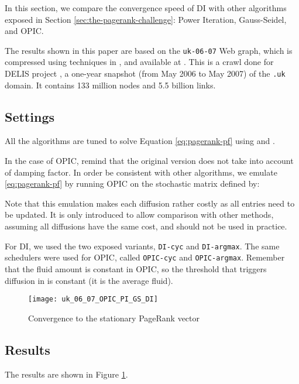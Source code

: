 \documentclass{llncs}
\begin{document}
\label{sec:experiments}
In this section, we compare the convergence speed of DI with other algorithms exposed in Section \ref{sec:the-pagerank-challenge}: Power Iteration, Gauss-Seidel, and OPIC.

The results shown in this paper are based on the 
\texttt{uk-06-07} Web graph, which is compressed using techniques in \cite{BRSLLP},\cite{BV03} and available at \cite{webgraph}. This is a crawl done for DELIS project \cite{DELISProj}, a one-year snapshot (from May 2006 to May 2007) of the \texttt{.uk} domain. It contains 133 million nodes and  5.5 billion links.

\subsection{Settings}

All the algorithms are tuned to solve Equation \eqref{eq:pagerank-pf} using  and .

In the case of OPIC, remind that the original version does not take into account of damping factor. In order be consistent with other algorithms, we emulate \eqref{eq:pagerank-pf} by running OPIC on the stochastic matrix 
 defined by:

Note that this emulation makes each diffusion rather costly as all entries need to be updated. It is only introduced to allow comparison with other methods, assuming all diffusions have the same cost, and should not be used in practice.

For DI, we used the two exposed variants, \texttt{DI-cyc} and \texttt{DI-argmax}. The same schedulers were used for OPIC, called 
\texttt{OPIC-cyc} and \texttt{OPIC-argmax}.
Remember that the fluid amount  is constant in OPIC, so the threshold that triggers diffusion in  is constant (it is the average fluid).
\begin{figure}
\begin{center}


\texttt{[image: uk\_06\_07\_OPIC\_PI\_GS\_DI]}
  
  \caption{Convergence to the stationary PageRank vector}
  \label{fig:exp}
 \end{center}
\end{figure}

\subsection{Results}

The results are shown in Figure \ref{fig:exp}.
\end{document}
